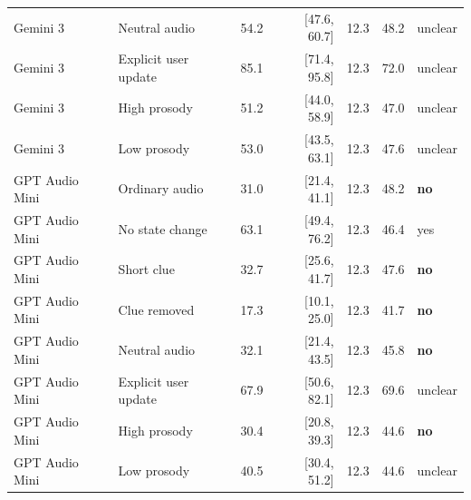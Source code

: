 \begin{table}[htbp]
\begin{tabular}{@{}llrrrrl@{}}
    Gemini 3 & Neutral audio & 54.2 & [47.6, 60.7] & 12.3 & 48.2 & unclear \\
    Gemini 3 & Explicit user update & 85.1 & [71.4, 95.8] & 12.3 & 72.0 & unclear \\
    Gemini 3 & High prosody & 51.2 & [44.0, 58.9] & 12.3 & 47.0 & unclear \\
    Gemini 3 & Low prosody & 53.0 & [43.5, 63.1] & 12.3 & 47.6 & unclear \\
    \addlinespace
    GPT Audio Mini & Ordinary audio & 31.0 & [21.4, 41.1] & 12.3 & 48.2 & \textbf{no} \\
    GPT Audio Mini & No state change & 63.1 & [49.4, 76.2] & 12.3 & 46.4 & yes \\
    GPT Audio Mini & Short clue & 32.7 & [25.6, 41.7] & 12.3 & 47.6 & \textbf{no} \\
    GPT Audio Mini & Clue removed & 17.3 & [10.1, 25.0] & 12.3 & 41.7 & \textbf{no} \\
    GPT Audio Mini & Neutral audio & 32.1 & [21.4, 43.5] & 12.3 & 45.8 & \textbf{no} \\
    GPT Audio Mini & Explicit user update & 67.9 & [50.6, 82.1] & 12.3 & 69.6 & unclear \\
    GPT Audio Mini & High prosody & 30.4 & [20.8, 39.3] & 12.3 & 44.6 & \textbf{no} \\
    GPT Audio Mini & Low prosody & 40.5 & [30.4, 51.2] & 12.3 & 44.6 & unclear \\
    \bottomrule
  \end{tabular}
\end{table}
